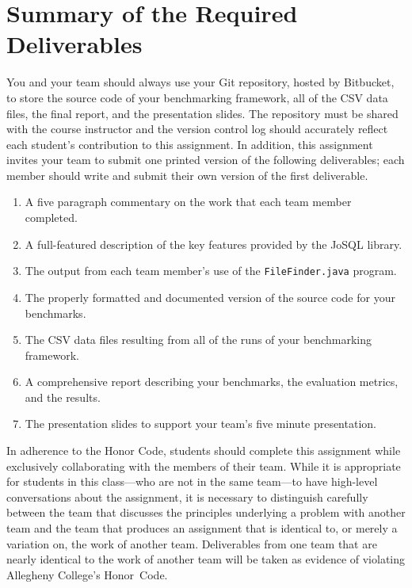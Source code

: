 \section*{Summary of the Required Deliverables}

You and your team should always use your Git repository, hosted by Bitbucket, to store the source code of your
benchmarking framework, all of the CSV data files, the final report, and the presentation slides. The repository must be
shared with the course instructor and the version control log should accurately reflect each student's contribution to
this assignment. In addition, this assignment invites your team to submit one printed version of the following
deliverables; each member should write and submit their own version of the first deliverable. 


\begin{enumerate}
  \item A five paragraph commentary on the work that each team member completed. 
  \item A full-featured description of the key features provided by the JoSQL library.
  \item The output from each team member's use of the {\tt FileFinder.java} program.
  \item The properly formatted and documented version of the source code for your benchmarks.
  \item The CSV data files resulting from all of the runs of your benchmarking framework.
  \item A comprehensive report describing your benchmarks, the evaluation metrics, and the results.
    \item The presentation slides to support your team's five minute presentation.
\end{enumerate}


In adherence to the Honor Code, students should complete this assignment while exclusively collaborating with the
members of their team. While it is appropriate for students in this class---who are not in the same team---to have
high-level conversations about the assignment, it is necessary to distinguish carefully between the team that discusses
the principles underlying a problem with another team and the team that produces an assignment that is identical to, or
merely a variation on, the work of another team.  Deliverables from one team that are nearly identical to the work of
another team will be taken as evidence of violating Allegheny College's \mbox{Honor Code}.






